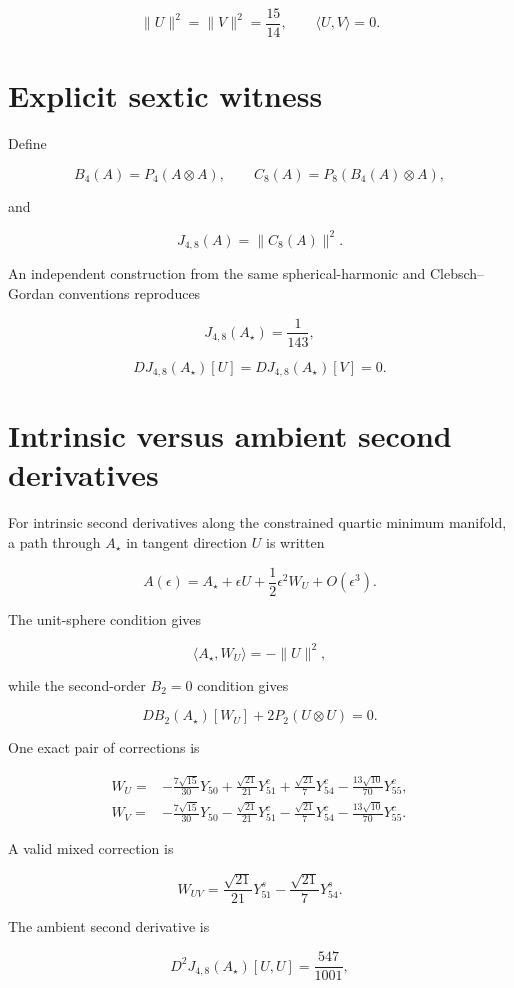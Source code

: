 \[
\|U\|^2=\|V\|^2=\frac{15}{14},
\qquad
\langle U,V\rangle=0.
\]

\section*{Explicit sextic witness}

Define

\[
B_4(A)=P_4(A\otimes A),
\qquad
C_8(A)=P_8(B_4(A)\otimes A),
\]

and

\[
J_{4,8}(A)=\|C_8(A)\|^2.
\]

An independent construction from the same spherical-harmonic and Clebsch--Gordan conventions reproduces

\[
J_{4,8}(A_\star)=\frac1{143},
\]

\[
DJ_{4,8}(A_\star)[U]=DJ_{4,8}(A_\star)[V]=0.
\]

\section*{Intrinsic versus ambient second derivatives}

For intrinsic second derivatives along the constrained quartic minimum manifold, a path through $A_\star$ in tangent direction $U$ is written

\[
A(\epsilon)=A_\star+\epsilon U+\frac12\epsilon^2W_U+O(\epsilon^3).
\]

The unit-sphere condition gives

\[
\langle A_\star,W_U\rangle=-\|U\|^2,
\]

while the second-order $B_2=0$ condition gives

\[
DB_2(A_\star)[W_U]+2P_2(U\otimes U)=0.
\]

One exact pair of corrections is

\begin{align*}
W_U={}&-\frac{7\sqrt{15}}{30}Y_{50}
+\frac{\sqrt{21}}{21}Y^c_{51}
+\frac{\sqrt{21}}7Y^c_{54}
-\frac{13\sqrt{10}}{70}Y^c_{55},\\
W_V={}&-\frac{7\sqrt{15}}{30}Y_{50}
-\frac{\sqrt{21}}{21}Y^c_{51}
-\frac{\sqrt{21}}7Y^c_{54}
-\frac{13\sqrt{10}}{70}Y^c_{55}.
\end{align*}

A valid mixed correction is

\[
W_{UV}=\frac{\sqrt{21}}{21}Y^s_{51}-\frac{\sqrt{21}}7Y^s_{54}.
\]

The ambient second derivative is

\[
D^2J_{4,8}(A_\star)[U,U]=\frac{547}{1001},
\]

